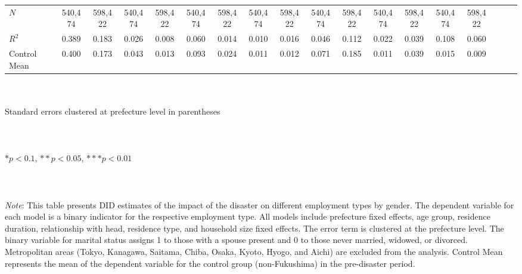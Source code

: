 \documentclass[a4paper,12pt]{article}
\begin{document}
\begin{table}[htbp]
{\begin{tabular}{@{}l*{17}{c}@{}}
\midrule
$\textit{N}$&  540,474         &  598,422         &  540,474         &  598,422         &  540,474         &  598,422         &  540,474         &  598,422         &  540,474         &  598,422         &  540,474         &  598,422         &  540,474         &  598,422         \\
$\textit{R}^2$&    0.389         &    0.183         &    0.026         &    0.008         &    0.060         &    0.014         &    0.010         &    0.016         &    0.046         &    0.112         &    0.022         &    0.039         &    0.108         &    0.060         \\
Control Mean&    0.400         &    0.173         &    0.043         &    0.013         &    0.093         &    0.024         &    0.011         &    0.012         &    0.071         &    0.185         &    0.011         &    0.039         &    0.015         &    0.009         \\
\bottomrule
\end{tabular}}
\raggedright
\\\\{\linewidth}{\tiny Standard errors clustered at prefecture level in parentheses}\\\\
\vspace{-0.2cm}
\\\\{\linewidth}{\tiny $*p<0.1$, $**p<0.05$, $***p<0.01$}\\\\
\\\\{\linewidth}{\tiny \textit{Note}: This table presents DID estimates of the impact of the disaster on different employment types by gender. The dependent variable for each model is a binary indicator for the respective employment type. All models include prefecture fixed effects, age group, residence duration, relationship with head, residence type, and household size fixed effects. The error term is clustered at the prefecture level. The binary variable for marital status assigns 1 to those with a spouse present and 0 to those never married, widowed, or divorced. Metropolitan areas (Tokyo, Kanagawa, Saitama, Chiba, Osaka, Kyoto, Hyogo, and Aichi) are excluded from the analysis. Control Mean represents the mean of the dependent variable for the control group (non-Fukushima) in the pre-disaster period.}

\label{table:DID_Each_Employment_Type}

\end{table}
\end{document}

